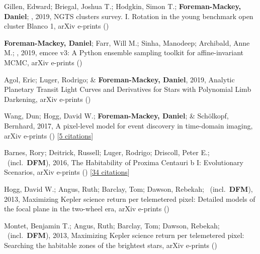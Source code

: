 \item[{\color{numcolor}\scriptsize7}] Gillen, Edward; Briegal, Joshua T.; Hodgkin, Simon T.; \textbf{Foreman-Mackey, Daniel}; \etal, 2019, NGTS clusters survey. I. Rotation in the young benchmark open cluster Blanco 1, arXiv e-prints ()

\item[{\color{numcolor}\scriptsize6}] \textbf{Foreman-Mackey, Daniel}; Farr, Will M.; Sinha, Manodeep; Archibald, Anne M.; \etal, 2019, emcee v3: A Python ensemble sampling toolkit for affine-invariant MCMC, arXiv e-prints ()

\item[{\color{numcolor}\scriptsize5}] Agol, Eric; Luger, Rodrigo; \& \textbf{Foreman-Mackey, Daniel}, 2019, Analytic Planetary Transit Light Curves and Derivatives for Stars with Polynomial Limb Darkening, arXiv e-prints ()

\item[{\color{numcolor}\scriptsize4}] Wang, Dun; Hogg, David W.; \textbf{Foreman-Mackey, Daniel}; \& Sch{\"o}lkopf, Bernhard, 2017, A pixel-level model for event discovery in time-domain imaging, arXiv e-prints () [\href{https://ui.adsabs.harvard.edu/abs/2017arXiv171002428W}{5 citations}]

\item[{\color{numcolor}\scriptsize3}] Barnes, Rory; Deitrick, Russell; Luger, Rodrigo; Driscoll, Peter E.; \etal\ (incl.\ \textbf{DFM}), 2016, The Habitability of Proxima Centauri b I: Evolutionary Scenarios, arXiv e-prints () [\href{https://ui.adsabs.harvard.edu/abs/2016arXiv160806919B}{34 citations}]

\item[{\color{numcolor}\scriptsize2}] Hogg, David W.; Angus, Ruth; Barclay, Tom; Dawson, Rebekah; \etal\ (incl.\ \textbf{DFM}), 2013, Maximizing Kepler science return per telemetered pixel: Detailed models of the focal plane in the two-wheel era, arXiv e-prints ()

\item[{\color{numcolor}\scriptsize1}] Montet, Benjamin T.; Angus, Ruth; Barclay, Tom; Dawson, Rebekah; \etal\ (incl.\ \textbf{DFM}), 2013, Maximizing Kepler science return per telemetered pixel: Searching the habitable zones of the brightest stars, arXiv e-prints ()